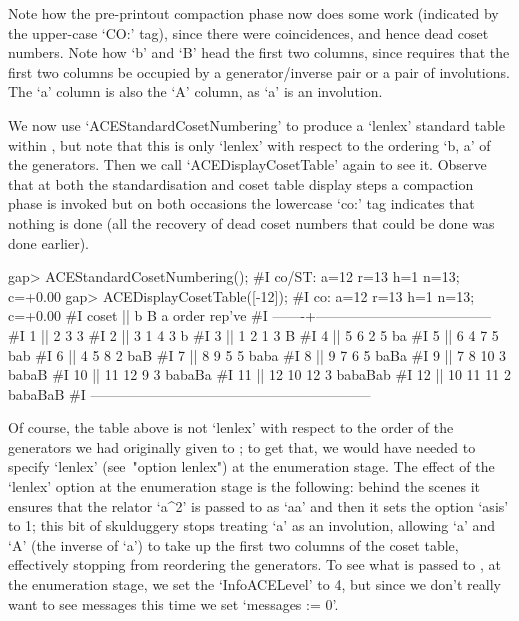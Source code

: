Note  how  the  pre-printout  compaction  phase  now  does  some  work
(indicated  by  the  upper-case   `CO:'   tag),   since   there   were
coincidences, and hence dead coset numbers. Note how `b' and `B'  head
the first two columns,  since  {\ACE}  requires  that  the  first  two
columns  be  occupied  by  a  generator/inverse  pair  or  a  pair  of
involutions. The `a' column is also the  `A'  column,  as  `a'  is  an
involution.

We now use `ACEStandardCosetNumbering' to produce a `lenlex'  standard
table within {\ACE}, but note that this is only `lenlex' with  respect
to  the  ordering   `b, a'   of   the   generators.   Then   we   call
`ACEDisplayCosetTable' again to see  it.  Observe  that  at  both  the
standardisation and coset table display steps a  compaction  phase  is
invoked but on both occasions the lowercase `co:' tag  indicates  that
nothing is done (all the recovery of dead coset numbers that could  be
done was done earlier).

\beginexample
gap> ACEStandardCosetNumbering();
#I  co/ST: a=12 r=13 h=1 n=13; c=+0.00
gap> ACEDisplayCosetTable([-12]);
#I  co: a=12 r=13 h=1 n=13; c=+0.00
#I   coset ||      b      B      a   order   rep've
#I  -------+--------------------------------------
#I       1 ||      2      3      3
#I       2 ||      3      1      4       3   b
#I       3 ||      1      2      1       3   B
#I       4 ||      5      6      2       5   ba
#I       5 ||      6      4      7       5   bab
#I       6 ||      4      5      8       2   baB
#I       7 ||      8      9      5       5   baba
#I       8 ||      9      7      6       5   baBa
#I       9 ||      7      8     10       3   babaB
#I      10 ||     11     12      9       3   babaBa
#I      11 ||     12     10     12       3   babaBab
#I      12 ||     10     11     11       2   babaBaB
#I  ------------------------------------------------------------
\endexample

Of course, the table above is not `lenlex' with respect to  the  order
of the generators we had originally given to {\ACE}; to get  that,  we
would have needed to specify `lenlex'  (see~"option  lenlex")  at  the
enumeration  stage.  The  effect  of  the  `lenlex'  option   at   the
enumeration stage is the following: behind the scenes it ensures  that
the relator `a^2' is passed to {\ACE} as `aa' and  then  it  sets  the
option `asis' to 1; this bit of skulduggery stops {\ACE} treating  `a'
as an involution, allowing `a' and `A' (the inverse of `a') to take up
the first two columns of the coset table, effectively stopping  {\ACE}
from reordering the generators. To see what is passed  to  {\ACE},  at
the enumeration stage, we set the `InfoACELevel' to 4,  but  since  we
don't really want to see messages this time we set `messages := 0'.

